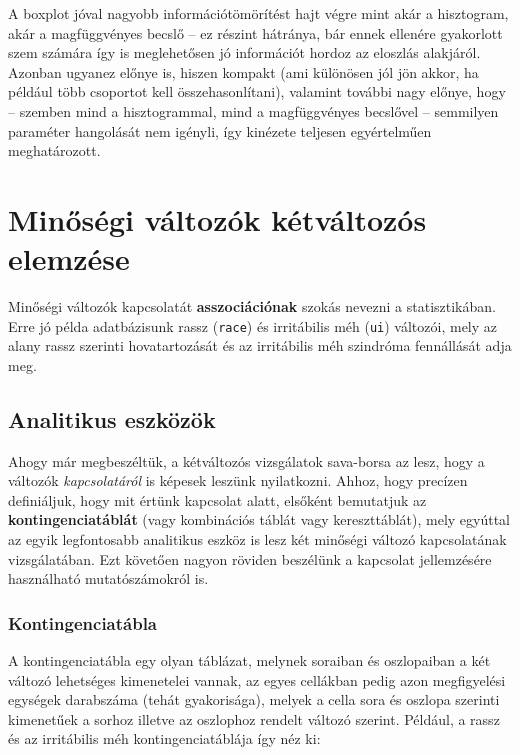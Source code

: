 \documentclass[
]{book}
\begin{document}
A boxplot jóval nagyobb információtömörítést hajt végre mint akár a hisztogram, akár a magfüggvényes becslő -- ez részint hátránya, bár ennek ellenére gyakorlott szem számára így is meglehetősen jó információt hordoz az eloszlás alakjáról. Azonban ugyanez előnye is, hiszen kompakt (ami különösen jól jön akkor, ha például több csoportot kell összehasonlítani), valamint további nagy előnye, hogy -- szemben mind a hisztogrammal, mind a magfüggvényes becslővel -- semmilyen paraméter hangolását nem igényli, így kinézete teljesen egyértelműen meghatározott.

\hypertarget{deskriptivminketvalt}{%
\section{Minőségi változók kétváltozós elemzése}\label{deskriptivminketvalt}}

Minőségi változók kapcsolatát \textbf{asszociációnak} szokás nevezni a statisztikában. Erre jó példa adatbázisunk rassz (\texttt{race}) és irritábilis méh (\texttt{ui}) változói, mely az alany rassz szerinti hovatartozását és az irritábilis méh szindróma fennállását adja meg.

\hypertarget{deskriptivminketvaltanalitikus}{%
\subsection{Analitikus eszközök}\label{deskriptivminketvaltanalitikus}}

Ahogy már megbeszéltük, a kétváltozós vizsgálatok sava-borsa az lesz, hogy a változók \emph{kapcsolatáról} is képesek leszünk nyilatkozni. Ahhoz, hogy precízen definiáljuk, hogy mit értünk kapcsolat alatt, elsőként bemutatjuk az \textbf{kontingenciatáblát} (vagy kombinációs táblát vagy kereszttáblát), mely egyúttal az egyik legfontosabb analitikus eszköz is lesz két minőségi változó kapcsolatának vizsgálatában. Ezt követően nagyon röviden beszélünk a kapcsolat jellemzésére használható mutatószámokról is.

\hypertarget{deskriptivminketvaltanalitikuskontingenciatabla}{%
\subsubsection{Kontingenciatábla}\label{deskriptivminketvaltanalitikuskontingenciatabla}}

A kontingenciatábla egy olyan táblázat, melynek soraiban és oszlopaiban a két változó lehetséges kimenetelei vannak, az egyes cellákban pedig azon megfigyelési egységek darabszáma (tehát gyakorisága), melyek a cella sora és oszlopa szerinti kimenetűek a sorhoz illetve az oszlophoz rendelt változó szerint. Például, a rassz és az irritábilis méh kontingenciatáblája így néz ki:
\end{document}
